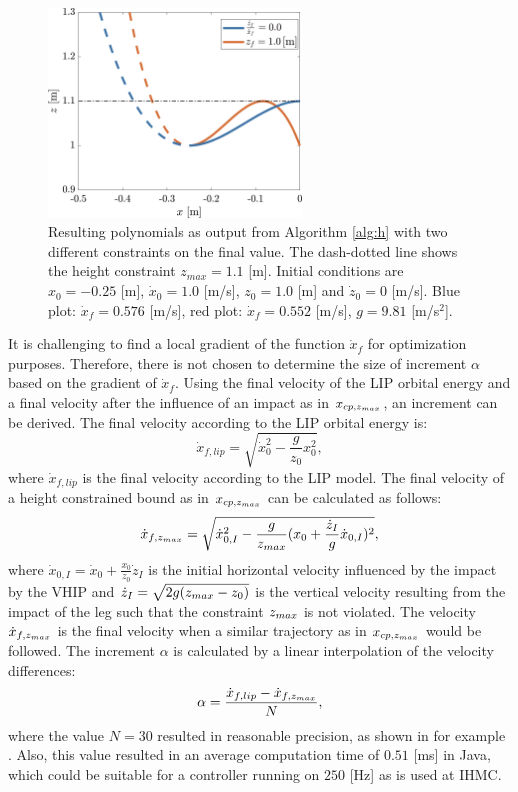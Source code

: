 \begin{figure}
\centering
\includegraphics[width=0.6\textwidth]{STYLESTUFF/polynomialHeightViz.png}
\caption{Resulting polynomials as output from Algorithm \ref{alg:h} with two different constraints on the final value. The dash-dotted line shows the height constraint $z_{max}=1.1$ [m]. Initial conditions are $x_0=-0.25$ [m], $\dot{x}_0=1.0$ [m/s], $z_0=1.0$ [m] and $\dot{z}_0=0$ [m/s]. Blue plot: $\dot{x}_f=0.576$ [m/s], red plot: $\dot{x}_f=0.552$ [m/s], $g=9.81$ [m/s$^2$]. }
\label{fig:polheight}
\end{figure}

It is challenging to find a local gradient of the function $\dot{x}_f$ for optimization purposes. Therefore, there is not chosen to determine the size of increment $\alpha$ based on the gradient of $\dot{x}_f$. Using the final velocity of the \ac{LIP} orbital energy and a final velocity after the influence of an impact as in $x_{cp,z_{max}}$, an increment can be derived. 
The final velocity according to the \ac{LIP} orbital energy is:
\begin{equation}
	\dot{x}_{f,lip} = \sqrt{\dot{x}_0^2-\frac{g}{z_0}x_0^2},
\end{equation}
where $\dot{x}_{f,lip}$ is the final velocity according to the \ac{LIP} model. The final velocity of a height constrained bound as in $x_{cp,z_{max}}$ can be calculated as follows:
\begin{equation}
	\dot{x}_{f,z_{max}} = \sqrt{\dot{x}_{0,I}^2-\frac{g}{z_{max}}(x_0+\frac{\dot{z}_I}{g}\dot{x}_{0,I})^2},
\end{equation}
where $\dot{x}_{0,I}=\dot{x}_0 + \frac{x_0}{z_0}\dot{z}_I$ is the initial horizontal velocity influenced by the impact by the \ac{VHIP} and $\dot{z}_I = \sqrt{2g(z_{max}-z_0)}$ is the vertical velocity resulting from the impact of the leg such that the constraint $z_{max}$ is not violated. The velocity $\dot{x}_{f,z_{max}}$ is the final velocity when a similar trajectory as in $x_{cp,z_{max}}$ would be followed. The increment $\alpha$ is calculated by a linear interpolation of the velocity differences:
\begin{equation}
	\alpha =\frac{\dot{x}_{f,lip} -\dot{x}_{f,z_{max}}}{N},
\end{equation}
where the value $N=30$ resulted in reasonable precision, as shown in for example . Also, this value resulted in an average computation time of $0.51$ [ms] in Java, which could be suitable for a controller running on $250$ [Hz] as is used at \ac{IHMC}.

